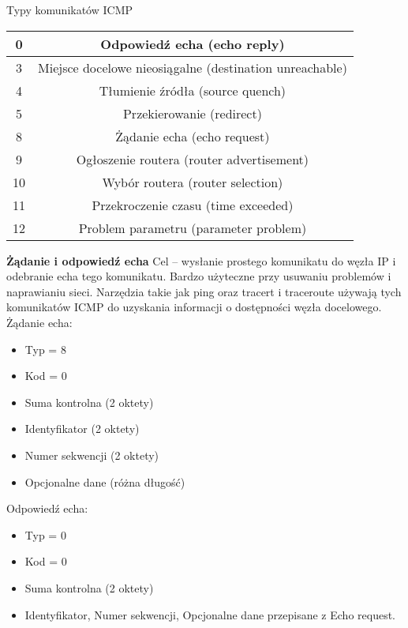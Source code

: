 \documentclass[../main.tex]{subfiles}
\begin{document}
    Typy komunikatów ICMP
    \begin{tabular}{|c|c|}
        \hline
        0 & Odpowiedź echa (echo reply)\\
        \hline
        3 & Miejsce docelowe nieosiągalne (destination unreachable)\\
        \hline
        4 & Tłumienie źródła (source quench)\\
        \hline
        5 & Przekierowanie (redirect)\\
        \hline
        8 & Żądanie echa (echo request)\\
        \hline
        9 & Ogłoszenie routera (router advertisement)\\
        \hline
        10 & Wybór routera (router selection)\\
        \hline
        11 & Przekroczenie czasu (time exceeded)\\
        \hline
        12 & Problem parametru (parameter problem)\\
        \hline
    \end{tabular}

    \textbf{Żądanie i odpowiedź echa}
    Cel – wysłanie prostego komunikatu do węzła IP i odebranie echa tego komunikatu. Bardzo
    użyteczne przy usuwaniu problemów i naprawianiu sieci. Narzędzia takie jak ping oraz tracert i traceroute używają tych komunikatów ICMP do
    uzyskania informacji o dostępności węzła docelowego.\\

    Żądanie echa:
    \begin{itemize}
        \item Typ = 8
        \item Kod = 0
        \item Suma kontrolna (2 oktety)
        \item Identyfikator (2 oktety)
        \item Numer sekwencji (2 oktety)
        \item Opcjonalne dane (różna długość)
    \end{itemize}

    Odpowiedź echa:
    \begin{itemize}
        \item Typ = 0
        \item Kod = 0
        \item Suma kontrolna (2 oktety)
        \item Identyfikator, Numer sekwencji, Opcjonalne dane przepisane z Echo request.
    \end{itemize}
\end{document}
